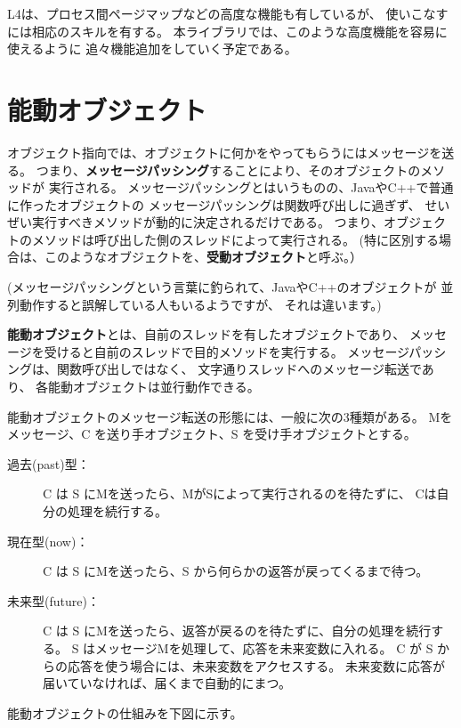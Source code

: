 L4は、プロセス間ページマップなどの高度な機能も有しているが、
使いこなすには相応のスキルを有する。
本ライブラリでは、このような高度機能を容易に使えるように
追々機能追加をしていく予定である。


\section{能動オブジェクト}

オブジェクト指向では、オブジェクトに何かをやってもらうにはメッセージを送る。
つまり、{\bf メッセージパッシング}することにより、そのオブジェクトのメソッドが
実行される。
メッセージパッシングとはいうものの、JavaやC++で普通に作ったオブジェクトの
メッセージパッシングは関数呼び出しに過ぎず、
せいぜい実行すべきメソッドが動的に決定されるだけである。
つまり、オブジェクトのメソッドは呼び出した側のスレッドによって実行される。
(特に区別する場合は、このようなオブジェクトを、{\bf 受動オブジェクト}と呼ぶ。）

(メッセージパッシングという言葉に釣られて、JavaやC++のオブジェクトが
並列動作すると誤解している人もいるようですが、
それは違います。)

{\bf 能動オブジェクト}とは、自前のスレッドを有したオブジェクトであり、
メッセージを受けると自前のスレッドで目的メソッドを実行する。
メッセージパッシングは、関数呼び出しではなく、
文字通りスレッドへのメッセージ転送であり、
各能動オブジェクトは並行動作できる。

能動オブジェクトのメッセージ転送の形態には、一般に次の3種類がある。
Mをメッセージ、C を送り手オブジェクト、S を受け手オブジェクトとする。
\begin{description}
\item[過去(past)型：]
  C は S にMを送ったら、MがSによって実行されるのを待たずに、
  Cは自分の処理を続行する。

\item[現在型(now)：]
  C は S にMを送ったら、S から何らかの返答が戻ってくるまで待つ。

\item[未来型(future)：]
  C は S にMを送ったら、返答が戻るのを待たずに、自分の処理を続行する。
  S はメッセージMを処理して、応答を未来変数に入れる。
  C が S からの応答を使う場合には、未来変数をアクセスする。
  未来変数に応答が届いていなければ、届くまで自動的にまつ。
\end{description}


能動オブジェクトの仕組みを下図に示す。

